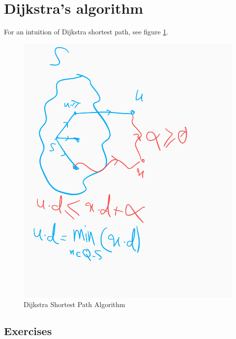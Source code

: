 \documentclass{book}
\begin{document}
	\section{Dijkstra's algorithm}
	For an intuition of Dijkstra shortest path, see figure \ref{fig:dijkstra-shortest-path-algorithm}.
	\begin{figure}
	\centering
	\caption{Dijkstra Shortest Path Algorithm}
	\label{fig:dijkstra-shortest-path-algorithm}
	\includegraphics[width=\linewidth]{images/dijkstra-shortest-path.jpg}
	\end{figure}
	\subsection{Exercises}
\end{document}
